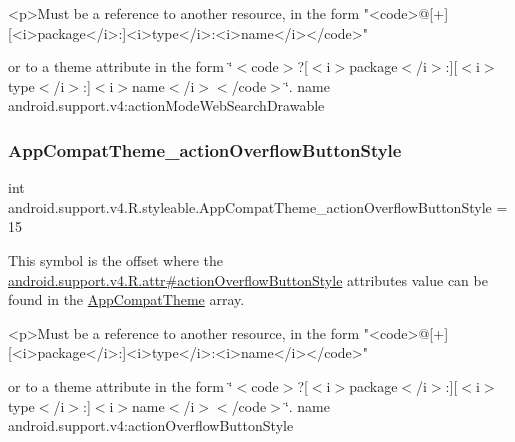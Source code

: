 \begin{DoxyVerb}      <p>Must be a reference to another resource, in the form "<code>@[+][<i>package</i>:]<i>type</i>:<i>name</i></code>"
\end{DoxyVerb}
 or to a theme attribute in the form \char`\"{}$<$code$>$?\mbox{[}$<$i$>$package$<$/i$>$\+:\mbox{]}\mbox{[}$<$i$>$type$<$/i$>$\+:\mbox{]}$<$i$>$name$<$/i$>$$<$/code$>$\char`\"{}.  name android.\+support.\+v4\+:action\+Mode\+Web\+Search\+Drawable \mbox{\label{classandroid_1_1support_1_1v4_1_1R_1_1styleable_a3d2d5375ec6b6f4b8c965c1a321d256a}} 
\subsubsection{\texorpdfstring{App\+Compat\+Theme\+\_\+action\+Overflow\+Button\+Style}{AppCompatTheme\_actionOverflowButtonStyle}}
{\footnotesize\ttfamily int android.\+support.\+v4.\+R.\+styleable.\+App\+Compat\+Theme\+\_\+action\+Overflow\+Button\+Style = 15\hspace{0.3cm}{\ttfamily [static]}}

This symbol is the offset where the \hyperlink{classandroid_1_1support_1_1v4_1_1R_1_1attr_a32592f9d2b2349d58f91a3caf7a05337}{android.\+support.\+v4.\+R.\+attr\#action\+Overflow\+Button\+Style} attribute\textquotesingle{}s value can be found in the \hyperlink{classandroid_1_1support_1_1v4_1_1R_1_1styleable_ac07ebbe62ed977f6dcaadc6397840ace}{App\+Compat\+Theme} array.

\begin{DoxyVerb}      <p>Must be a reference to another resource, in the form "<code>@[+][<i>package</i>:]<i>type</i>:<i>name</i></code>"
\end{DoxyVerb}
 or to a theme attribute in the form \char`\"{}$<$code$>$?\mbox{[}$<$i$>$package$<$/i$>$\+:\mbox{]}\mbox{[}$<$i$>$type$<$/i$>$\+:\mbox{]}$<$i$>$name$<$/i$>$$<$/code$>$\char`\"{}.  name android.\+support.\+v4\+:action\+Overflow\+Button\+Style \mbox{\label{classandroid_1_1support_1_1v4_1_1R_1_1styleable_a409729e91a9f66ebb049d84ae7efa9cc}} 
